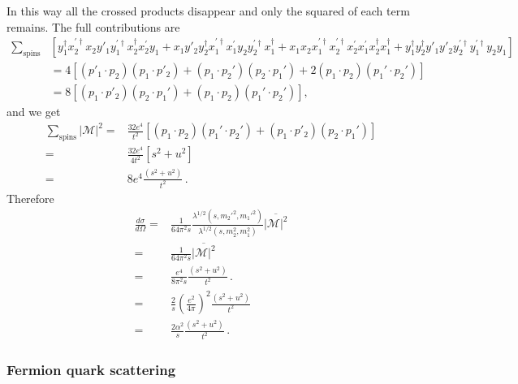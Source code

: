 In this way all the crossed products disappear and only the squared of each term remains. The full contributions are
\begin{align}
 \sum_{\text{spins}}& \left[y^{\dagger}_1x^{\prime\dagger}_2x_2y'_1y^{\prime\dagger}_1x_2^{\dagger} x^{\prime}_2y_1
+x_1y'_2 y^{\dagger}_2x^{\prime\dagger}_1x^{\prime}_1y_2 y^{\prime\dagger}_2x_1^{\dagger} +x_1x_2x^{\prime\dagger}_1x^{\prime\dagger}_2x^{\prime}_2 x^{\prime}_1 x_2^{\dagger} x_1^{\dagger}
+y^{\dagger}_1y^{\dagger}_2y'_1y'_2y_2^{\prime\dagger} y_1^{\prime\dagger} y_2 y_1 \right] \nonumber\\
  &= 4 \left[  \left( p'_1\cdot p_2 \right)\left(p_1\cdot p'_2  \right) + \left( p_1\cdot p_2' \right)\left( p_2\cdot p_1' \right) +2\left( p_1\cdot p_2 \right)\left( p_1'\cdot p_2' \right)
  \right] \nonumber\\
  &= 8 \left[ \left(p_1\cdot p'_2  \right) \left( p_2\cdot p_1' \right) +\left( p_1\cdot p_2 \right)\left( p_1'\cdot p_2' \right)  \right],
\end{align}
and we get
\begin{align}
   \sum_{\text{spins}}|\mathcal{M}|^2=&
\frac{32e^4}{t^2}\left[ \left( p_1\cdot p_2 \right)\left( p_1'\cdot p_2' \right) + \left(p_1\cdot p'_2  \right) \left( p_2\cdot p_1' \right)  \right] \nonumber\\
=& \frac{32e^4}{4t^2} \left[ s^2+u^2 \right] \nonumber\\
=& 8e^4 \frac{\left( s^2+u^2 \right)}{t^2}\,.
\end{align}
Therefore
\begin{align}
   \frac{d\sigma}{d\Omega}=&\frac{1}{64\pi^2s}
\frac{\lambda^{1/2}(s,{m_2'}^2,{m_1'}^2)}{\lambda^{1/2}(s,m_2^2,m_1^2)}
\overline{|\mathcal{M}|^2} \nonumber\\
=&\frac{1}{64\pi^2s}\overline{|\mathcal{M}|^2} \nonumber\\
=&\frac{e^4}{8\pi^2s}\frac{\left( s^2+u^2 \right)}{t^2}\,. \nonumber\\
=&\frac{2}{s}\left( \frac{e^2}{4\pi} \right)^2\frac{\left( s^2+u^2 \right)}{t^2}\nonumber\\
=&\frac{2\alpha^2}{s}\frac{\left( s^2+u^2 \right)}{t^2}\,.
\end{align}



\subsubsection{Fermion quark scattering}

